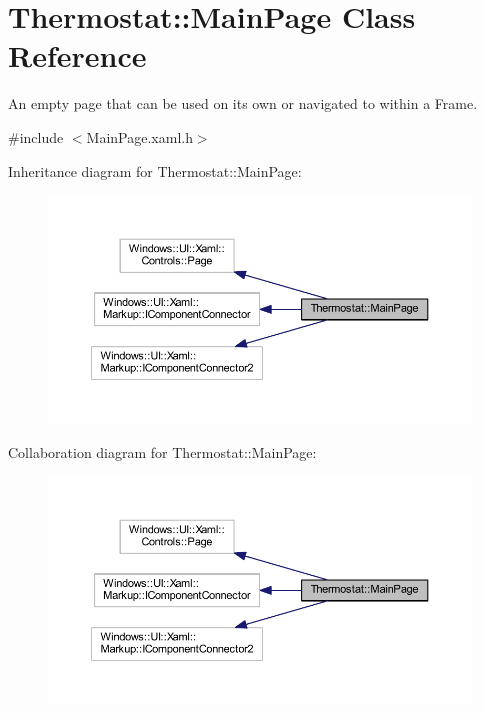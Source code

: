 \hypertarget{class_thermostat_1_1_main_page}{}\section{Thermostat\+:\+:Main\+Page Class Reference}
\label{class_thermostat_1_1_main_page}


An empty page that can be used on its own or navigated to within a Frame.  




{\ttfamily \#include $<$Main\+Page.\+xaml.\+h$>$}



Inheritance diagram for Thermostat\+:\+:Main\+Page\+:\nopagebreak
\begin{figure}[H]
\begin{center}
\leavevmode
\includegraphics[width=350pt]{class_thermostat_1_1_main_page__inherit__graph}
\end{center}
\end{figure}


Collaboration diagram for Thermostat\+:\+:Main\+Page\+:\nopagebreak
\begin{figure}[H]
\begin{center}
\leavevmode
\includegraphics[width=350pt]{class_thermostat_1_1_main_page__coll__graph}
\end{center}
\end{figure}
